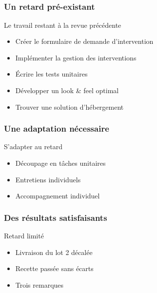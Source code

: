 \speaker{\Pierre{}}
\subsection{} %

\begin{frame}
\frametitle{Un retard pré-existant}
\begin{block}{Le travail restant à la revue précédente}
\begin{itemize}
	\item Créer le formulaire de demande d'intervention
	\item Implémenter la gestion des interventions
	\item Écrire les tests unitaires
	\item Développer un look \& feel optimal
	\item Trouver une solution d’hébergement
\end{itemize}
\end{block}
\end{frame}


\begin{frame}
\frametitle{Une adaptation nécessaire}
\begin{block}{S'adapter au retard}
\begin{itemize}
	\item Découpage en tâches unitaires
	\item Entretiens individuels
	\item Accompagnement individuel
\end{itemize}
\end{block}
\end{frame}


\begin{frame}
\frametitle{Des résultats satisfaisants}
\begin{block}{Retard limité}
\begin{itemize}
	\item Livraison du lot 2 décalée
	\item Recette passée sans écarts
	\item Trois remarques
\end{itemize}
\end{block}
\end{frame}


